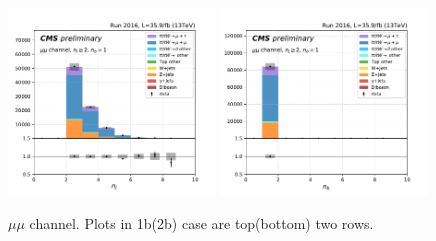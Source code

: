 \begin{figure}[ht]
    \includegraphics[width=0.49\textwidth]{chapters/Appendix/sectionPlots/figures/kinematics_pickles/mumu/1b/mumu_1b_nJets.pdf}
    \includegraphics[width=0.49\textwidth]{chapters/Appendix/sectionPlots/figures/kinematics_pickles/mumu/1b/mumu_1b_nBJets.pdf}
    
    \caption{$\mu\mu$ channel. Plots in 1b(2b) case are top(bottom) two rows.}
\end{figure}

